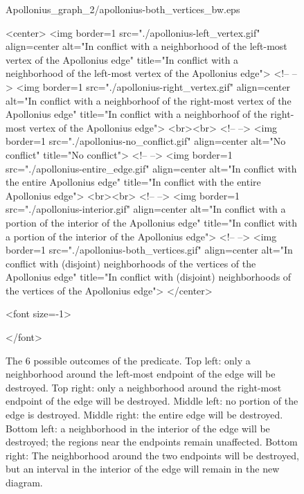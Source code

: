 \begin{figure}[!t]
\begin{ccTexOnly}
\begin{center}
{Apollonius_graph_2/apollonius-both_vertices_bw.eps}\\
\end{center}
\end{ccTexOnly}
\begin{ccHtmlOnly}
  <center>
  <img border=1 src="./apollonius-left_vertex.gif" align=center
  alt="In conflict with a neighborhood of the left-most vertex of the
  Apollonius edge"
  title="In conflict with a neighborhood of the left-most vertex of the Apollonius edge">
  <!-- -->
  <img border=1 src="./apollonius-right_vertex.gif" align=center
  alt="In conflict with a neighborhoof of the right-most vertex of the
  Apollonius edge"
  title="In conflict with a neighborhoof of the right-most vertex of the Apollonius edge">
  <br><br>
  <!-- -->
  <img border=1 src="./apollonius-no_conflict.gif" align=center
  alt="No conflict" title="No conflict">
  <!-- -->
  <img border=1 src="./apollonius-entire_edge.gif" align=center
  alt="In conflict with the entire Apollonius edge"
  title="In conflict with the entire Apollonius edge">
  <br><br>
  <!-- -->
  <img border=1 src="./apollonius-interior.gif" align=center
  alt="In conflict with a portion of the interior of the Apollonius
  edge"
  title="In conflict with a portion of the interior of the Apollonius edge">
  <!-- -->
  <img border=1 src="./apollonius-both_vertices.gif" align=center
  alt="In conflict with (disjoint) neighborhoods of the vertices of
  the Apollonius edge"
  title="In conflict with (disjoint) neighborhoods of the vertices of the Apollonius edge">
</center>
\end{ccHtmlOnly}
\begin{ccHtmlOnly}
<font size=-1>
\end{ccHtmlOnly}
\caption{The 6 possible outcomes of the
  \protect{} predicate.
  Top left: only a neighborhood around
  the left-most endpoint of the edge will be destroyed. Top right:
  only a neighborhood around the right-most endpoint of the edge will
  be destroyed. Middle left: no portion of the edge is destroyed.
  Middle right: the entire edge will be destroyed. Bottom left: a
  neighborhood in the interior of the edge
  will be destroyed; the regions near the endpoints remain
  unaffected. Bottom right: The neighborhood around the two endpoints
  will be destroyed, but an interval in the interior of the edge will
  remain in the new diagram.}\label{fig-ag2edgeconflict}
\begin{ccHtmlOnly}
</font>
\end{ccHtmlOnly}
\end{figure}

